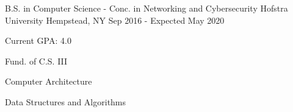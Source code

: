

\begin{cventries}

  \cventry
    {B.S. in Computer Science - Conc. in Networking and Cybersecurity} %
    {Hofstra University} %
    {Hempstead, NY} %
    {Sep 2016 - Expected May 2020} %
    {
      \begin{cvitems} %
        \item {Current GPA: 4.0} 
        \item {Fund. of C.S. III}
        \item {Computer Architecture}
        \item {Data Structures and Algorithms}
      \end{cvitems}
    }

%
\end{cventries}
